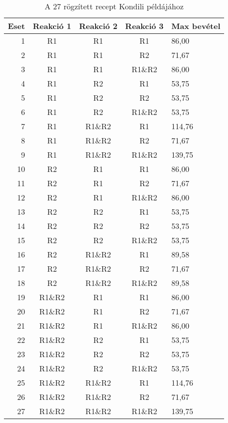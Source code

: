\begin{table}
	\begin{center}
		\caption{A 27 rögzített recept Kondili példájához}
		\captionsetup[table]{skip=10pt}
		\label{tabla1}
		\begin{tabular}{r|ccc|l}
		Eset & Reakció 1 & Reakció 2 & Reakció 3 & Max bevétel  \\ 
		\hline
		1    & R1        & R1        & R1        & 86,00        \\
		2    & R1        & R1        & R2        & 71,67        \\
		3    & R1        & R1        & R1\&R2    & 86,00        \\
		4    & R1        & R2        & R1        & 53,75        \\
		5    & R1        & R2        & R2        & 53,75        \\
		6    & R1        & R2        & R1\&R2    & 53,75        \\
		7    & R1        & R1\&R2    & R1        & 114,76       \\
		8    & R1        & R1\&R2    & R2        & 71,67        \\
		9    & R1        & R1\&R2    & R1\&R2    & 139,75       \\
		10   & R2        & R1        & R1        & 86,00        \\
		11   & R2        & R1        & R2        & 71,67        \\
		12   & R2        & R1        & R1\&R2    & 86,00        \\
		13   & R2        & R2        & R1        & 53,75        \\
		14   & R2        & R2        & R2        & 53,75        \\
		15   & R2        & R2        & R1\&R2    & 53,75        \\
		16   & R2        & R1\&R2    & R1        & 89,58        \\
		17   & R2        & R1\&R2    & R2        & 71,67        \\
		18   & R2        & R1\&R2    & R1\&R2    & 89,58        \\
		19   & R1\&R2    & R1        & R1        & 86,00        \\
		20   & R1\&R2    & R1        & R2        & 71,67        \\
		21   & R1\&R2    & R1        & R1\&R2    & 86,00        \\
		22   & R1\&R2    & R2        & R1        & 53,75        \\
		23   & R1\&R2    & R2        & R2        & 53,75        \\
		24   & R1\&R2    & R2        & R1\&R2    & 53,75        \\
		25   & R1\&R2    & R1\&R2    & R1        & 114,76       \\
		26   & R1\&R2    & R1\&R2    & R2        & 71,67        \\
		27   & R1\&R2    & R1\&R2    & R1\&R2    & 139,75      
		\end{tabular}
	\end{center}
\end{table}


